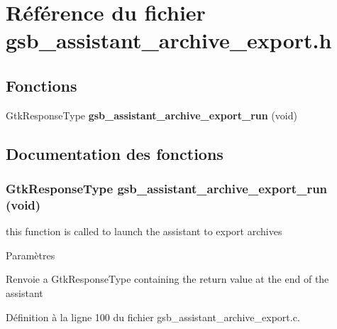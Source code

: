 \section{Référence du fichier gsb\_\-assistant\_\-archive\_\-export.h}
\label{gsb__assistant__archive__export_8h}
\subsection*{Fonctions}
\begin{DoxyCompactItemize}
\item 
GtkResponseType {\bf gsb\_\-assistant\_\-archive\_\-export\_\-run} (void)
\end{DoxyCompactItemize}


\subsection{Documentation des fonctions}
\subsubsection[{gsb\_\-assistant\_\-archive\_\-export\_\-run}]{\setlength{\rightskip}{0pt plus 5cm}GtkResponseType gsb\_\-assistant\_\-archive\_\-export\_\-run (void)}\label{gsb__assistant__archive__export_8h_a40ac4dec2f544da685d1013e9d3d84bb}
this function is called to launch the assistant to export archives


\begin{DoxyParams}{Paramètres}
\item[{\em }]\end{DoxyParams}
\begin{DoxyReturn}{Renvoie}
a GtkResponseType containing the return value at the end of the assistant 
\end{DoxyReturn}


Définition à la ligne 100 du fichier gsb\_\-assistant\_\-archive\_\-export.c.

